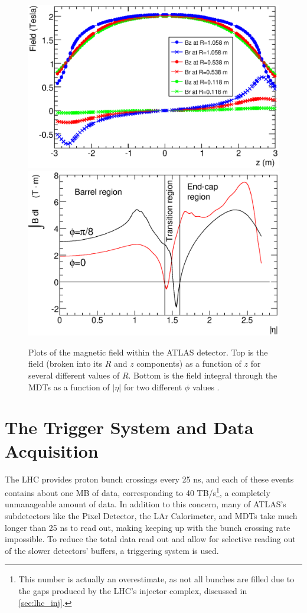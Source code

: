 \begin{centering}
\begin{figure}[!htb]
\myfloatalign
\includegraphics[width=.90\linewidth]{figures/atlas/solMeasB.eps}
\includegraphics[width=.90\linewidth]{figures/atlas/IBdl.eps}
\caption{Plots of the magnetic field within the \ac{ATLAS} detector. Top is the field (broken into its $R$ and $z$ components) as a function of $z$ for several different values of $R$. Bottom is the field integral through the \acp{MDT} as a function of $|\eta|$ for two different $\phi$ values \cite{PERF-2007-01}. }
\label{fig:bfield}
\end{figure}
\end{centering}

\section{The Trigger System and Data Acquisition}
\label{sec:Trigger}

The \ac{LHC} provides proton bunch crossings every 25 ns, and each of these events contains about one MB of data, corresponding to 40 TB/s\footnote{ This number is actually an overestimate, as not all bunches are filled due to the gaps produced by the \ac{LHC}'s injector complex, discussed in \autoref{sec:lhc_inj}.}, a completely unmanageable amount of data. In addition to this concern, many of \ac{ATLAS}'s subdetectors like the Pixel Detector, the LAr Calorimeter, and \acp{MDT} take much longer than 25 ns to read out, making keeping up with the bunch crossing rate impossible. To reduce the total data read out and allow for selective reading out of the slower detectors' buffers, a triggering system is used. 

